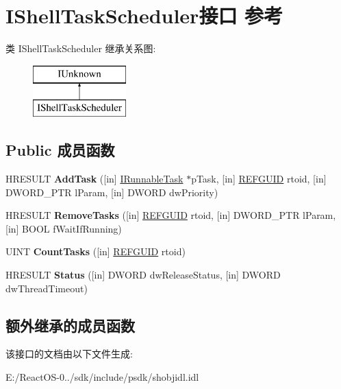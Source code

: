 \hypertarget{interface_i_shell_task_scheduler}{}\section{I\+Shell\+Task\+Scheduler接口 参考}
\label{interface_i_shell_task_scheduler}
类 I\+Shell\+Task\+Scheduler 继承关系图\+:\begin{figure}[H]
\begin{center}
\leavevmode
\includegraphics[height=2.000000cm]{interface_i_shell_task_scheduler}
\end{center}
\end{figure}
\subsection*{Public 成员函数}
\begin{DoxyCompactItemize}
\item 
\mbox{\label{interface_i_shell_task_scheduler_a5a32d18b58e168f2bcee064f6344f0ab}} 
H\+R\+E\+S\+U\+LT {\bfseries Add\+Task} (\mbox{[}in\mbox{]} \hyperlink{interface_i_runnable_task}{I\+Runnable\+Task} $\ast$p\+Task, \mbox{[}in\mbox{]} \hyperlink{struct___g_u_i_d}{R\+E\+F\+G\+U\+ID} rtoid, \mbox{[}in\mbox{]} D\+W\+O\+R\+D\+\_\+\+P\+TR l\+Param, \mbox{[}in\mbox{]} D\+W\+O\+RD dw\+Priority)
\item 
\mbox{\label{interface_i_shell_task_scheduler_ae0d48181d6731059502d5be5d6cd881f}} 
H\+R\+E\+S\+U\+LT {\bfseries Remove\+Tasks} (\mbox{[}in\mbox{]} \hyperlink{struct___g_u_i_d}{R\+E\+F\+G\+U\+ID} rtoid, \mbox{[}in\mbox{]} D\+W\+O\+R\+D\+\_\+\+P\+TR l\+Param, \mbox{[}in\mbox{]} B\+O\+OL f\+Wait\+If\+Running)
\item 
\mbox{\label{interface_i_shell_task_scheduler_adc9dfcdad906740d8688d0afac5f9c45}} 
U\+I\+NT {\bfseries Count\+Tasks} (\mbox{[}in\mbox{]} \hyperlink{struct___g_u_i_d}{R\+E\+F\+G\+U\+ID} rtoid)
\item 
\mbox{\label{interface_i_shell_task_scheduler_a2ee3dde66d672b5b33b0c77df24459ae}} 
H\+R\+E\+S\+U\+LT {\bfseries Status} (\mbox{[}in\mbox{]} D\+W\+O\+RD dw\+Release\+Status, \mbox{[}in\mbox{]} D\+W\+O\+RD dw\+Thread\+Timeout)
\end{DoxyCompactItemize}
\subsection*{额外继承的成员函数}


该接口的文档由以下文件生成\+:\begin{DoxyCompactItemize}
\item 
E\+:/\+React\+O\+S-\/0../sdk/include/psdk/shobjidl.\+idl\end{DoxyCompactItemize}
